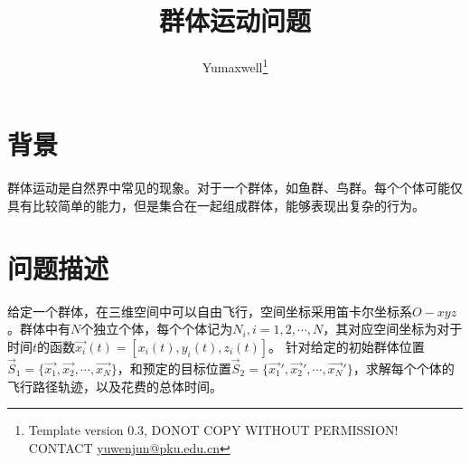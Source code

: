 




\pagestyle{fancy}
\lhead{}
\chead{}
\rhead{}
\lfoot{}
\rfoot{}

\title{\yh 群体运动问题}
\author{Yumaxwell\thanks{Template version 0.3, DONOT COPY WITHOUT PERMISSION! CONTACT \underline{yuwenjun@pku.edu.cn}}}
\maketitle
\thispagestyle{empty} %




\section{背景}
群体运动是自然界中常见的现象。对于一个群体，如鱼群、鸟群。每个个体可能仅具有比较简单的能力，但是集合在一起组成群体，能够表现出复杂的行为。

\section{问题描述}
给定一个群体，在三维空间中可以自由飞行，空间坐标采用笛卡尔坐标系$O-xyz$。群体中有$N$个独立个体，每个个体记为$N_i, i=1,2,\cdots,N$，其对应空间坐标为对于时间$t$的函数$\vec{x_i}(t) = [x_i(t),y_i(t),z_i(t)]$。
针对给定的初始群体位置$\vec{S}_1=\{\vec{x_1},\vec{x_2},\cdots,\vec{x_N}\}$，和预定的目标位置$\vec{S}_2=\{\vec{x_1}',\vec{x_2}',\cdots,\vec{x_N}'\}$，求解每个个体的飞行路径轨迹，以及花费的总体时间。

